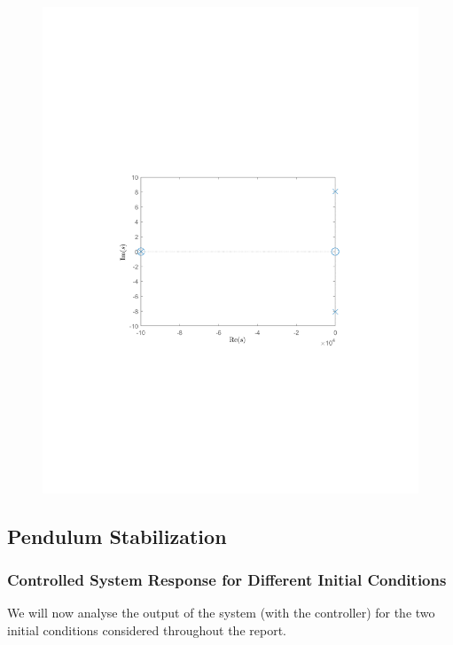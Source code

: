 \documentclass[10pt]{article}
\begin{document}
\begin{figure}[ht]
\begin{minipage}[b]{0.45\textwidth}
        \includegraphics[clip, trim=4.3cm 8.3cm 4.5cm 9.3cm,width=1\linewidth]{lab1/figs/section7_pole_zero_cls.pdf}
    \end{minipage}
\end{figure}

\subsection{Pendulum Stabilization}

\subsubsection{Controlled System Response for Different Initial Conditions}
We will now analyse the output of the system (with the controller) for the two initial conditions considered throughout the report. 
\end{document}

